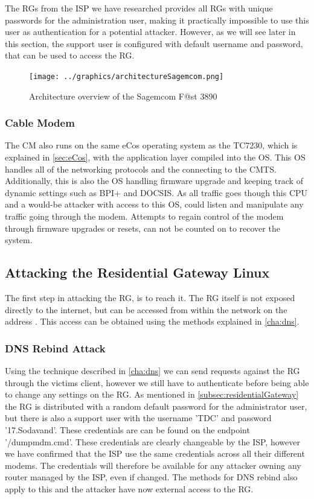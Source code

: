 The RGs from the ISP we have researched provides all RGs with unique passwords for the administration user, making it practically impossible to use this user as authentication for a potential attacker.
However, as we will see later in this section, the support user is configured with default username and password, that can be used to access the RG.

\begin{figure}[h]
  \texttt{[image: ../graphics/architectureSagemcom.png]}
  \caption{Architecture overview of the Sagemcom F@st 3890}
  \label{fig:architectureSagemcom}
\end{figure}

\subsubsection{Cable Modem}
The CM also runs on the same eCos operating system as the TC7230, which is explained in \cref{sec:eCos}, with the application layer compiled into the OS.
This OS handles all of the networking protocols and the connecting to the CMTS.
Additionally, this is also the OS handling firmware upgrade and keeping track of dynamic settings such as BPI+ and DOCSIS.
As all traffic goes though this CPU and a would-be attacker with access to this OS, could listen and manipulate any traffic going through the modem. 
Attempts to regain control of the modem through firmware upgrades or resets, can not be counted on to recover the system.

\subsection{Attacking the Residential Gateway Linux}
The first step in attacking the RG, is to reach it. The RG itself is not exposed directly
to the internet, but can be accessed from within the network on the address . This access can be obtained using the methods explained in \cref{cha:dns}.

\subsubsection{DNS Rebind Attack}
Using the technique described in \cref{cha:dns} we can send requests against the RG through the victims client, however we still
have to authenticate before being able to change any settings on the RG. As mentioned in \cref{subsec:residentialGateway} the RG is distributed with a random default password for the administrator user, but there is also a support user with the username ’TDC’ and password ’17.Sodavand’.
These credentials are can be found on the endpoint ’/dumpmdm.cmd’.
These credentials are clearly changeable by the ISP, however we have confirmed that the ISP use the same credentials across all their different modems. The credentials will therefore be available for any attacker owning any router managed by the ISP, even if changed. The methods for DNS rebind also apply to this and the attacker have now external access to the RG.

